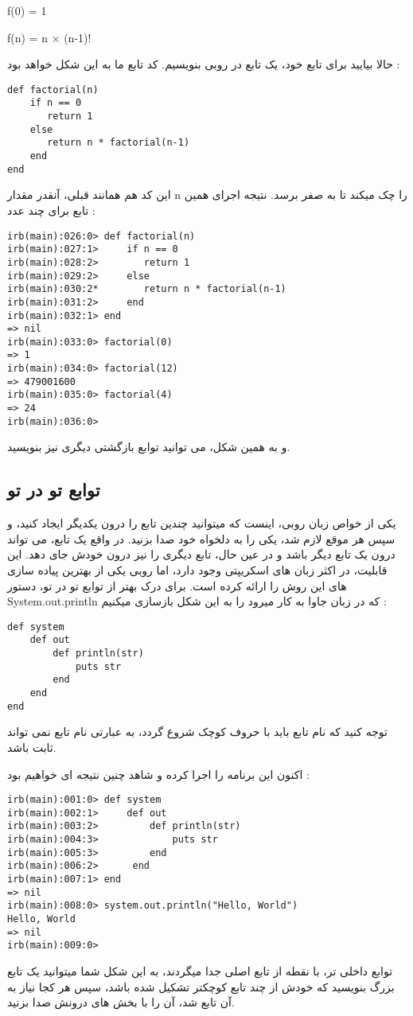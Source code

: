 \documentclass[11pt]{article}
\begin{document}
\begin{latin}
f(0) = 1

f(n) = n ‍× (n-1)!
\end{latin}
حالا بیایید برای تابع خود، یک تابع در روبی بنویسیم. کد تابع ما به این شکل خواهد بود :
\begin{latin}
\begin{verbatim}
def factorial(n)
    if n == 0
       return 1
    else
       return n * factorial(n-1)
    end
end
\end{verbatim}
\end{latin}
این کد هم همانند قبلی، آنقدر مقدار n را چک میکند تا به صفر برسد. نتیجه اجرای همین تابع برای چند عدد :
\begin{latin}
\begin{verbatim}
irb(main):026:0> def factorial(n)
irb(main):027:1>     if n == 0
irb(main):028:2>        return 1
irb(main):029:2>     else
irb(main):030:2*        return n * factorial(n-1)
irb(main):031:2>     end
irb(main):032:1> end
=> nil
irb(main):033:0> factorial(0)
=> 1
irb(main):034:0> factorial(12)
=> 479001600
irb(main):035:0> factorial(4)
=> 24
irb(main):036:0>
\end{verbatim}
\end{latin}
و به همین شکل، می توانید توابع بازگشتی دیگری نیز بنویسید. 
\subsection{توابع تو در تو}
یکی از خواص زبان روبی، اینست که میتوانید چندین تابع را درون یکدیگر ایجاد کنید، و سپس هر موقع لازم شد، یکی را به دلخواه خود صدا بزنید. در واقع یک تابع، می تواند درون یک تابع دیگر باشد و در عین حال، تابع دیگری را نیز درون خودش جای دهد. این قابلیت، در اکثر زبان های اسکریپتی وجود دارد، اما روبی یکی از بهترین پیاده سازی های این روش را ارائه کرده است. 
برای درک بهتر از توابع تو در تو، دستور System.out.println که در زبان جاوا به کار میرود را به این شکل بازسازی میکنیم :
\begin{latin}
\begin{verbatim}
def system
    def out
        def println(str)
            puts str
        end
    end
end
\end{verbatim}
\end{latin}
توجه کنید که نام تابع باید با حروف کوچک شروع گردد، به عبارتی نام تابع نمی تواند ثابت باشد. 

اکنون این برنامه را اجرا کرده و شاهد چنین نتیجه ای خواهیم بود :
\begin{latin}
\begin{verbatim}
irb(main):001:0> def system
irb(main):002:1>     def out
irb(main):003:2>         def println(str)
irb(main):004:3>             puts str
irb(main):005:3>         end
irb(main):006:2>      end
irb(main):007:1> end
=> nil
irb(main):008:0> system.out.println("Hello, World")
Hello, World
=> nil
irb(main):009:0> 
\end{verbatim}
\end{latin}
توابع داخلی تر، با نقطه از تابع اصلی جدا میگردند، به این شکل شما میتوانید یک تابع بزرگ بنویسید که خودش از چند تابع کوچکتر تشکیل شده باشد، سپس هر کجا نیاز به آن تابع شد، آن را با بخش های درونش صدا بزنید. 
\end{document}
